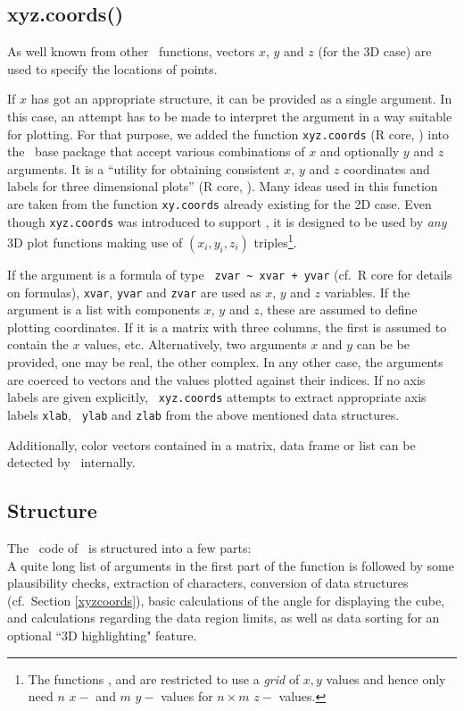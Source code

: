 \subsection{xyz.coords()\label{xyzcoords}}
As well known from other \RR\ functions, vectors $x$, $y$ and $z$ (for the
3D case) are used to specify the locations of points.

If $x$ has got an appropriate structure, it can be provided as a single
argument.  In this case, an attempt has to be made to interpret the
argument in a way suitable for plotting.
%
For that purpose, we added the function {\tt xyz.coords} (R core, )
into the \RR\ base package that accept various combinations of $x$ and
optionally $y$ and $z$ arguments.
%
It is a ``utility for obtaining consistent $x$, $y$ and $z$ coordinates and
labels for three dimensional plots'' (R core, ).  Many
ideas used in this function are taken from the function {\tt xy.coords}
already existing for the 2D case.
%
Even though {\tt xyz.coords} was introduced to support \sdd , it is
designed to be used by \textsl{any} 3D plot functions making use of $(x_i,
y_i, z_i)$ triples\footnote{The functions ,  and
   are restricted to use a \emph{grid} of $x,y$ values and
  hence only need $n$ $x-$ and $m$ $y-$ values for $n \times m$ $z-$
  values.}.

If the argument is a formula of type \verb& zvar ~ xvar + yvar&
(cf.\ R core \citeyear{r-lang} for details on formulas), {\tt xvar},
{\tt yvar} and {\tt zvar} are used as $x$, $y$ and $z$ variables.  If the
argument is a
list with components $x$, $y$ and $z$, these are assumed to define
plotting coordinates.  If it is a matrix with three columns, the first is
assumed to contain the $x$ values, etc.  Alternatively, two arguments $x$
and $y$ can be be provided, one may be real, the other complex.  In any
other case, the arguments are coerced to vectors and the values plotted
against their indices.  If no axis labels are given explicitly, {\tt
  xyz.coords} attempts to extract appropriate axis labels {\tt xlab}, {\tt
  ylab} and {\tt zlab} from the above mentioned data structures.

Additionally, color vectors contained in a matrix, data frame or list can
be detected by \sdd\ internally.


\subsection{Structure\label{structure}}
The \RR\ code of \sdd\ is structured into a few parts:\\
A quite long list of arguments in the first part of the function is followed by some plausibility checks,
extraction of characters, conversion of data structures (cf.\ Section \ref{xyzcoords}),
basic calculations of the angle for displaying the cube, and calculations regarding the data region limits,
as well as data sorting for an optional ``3D highlighting" feature.

